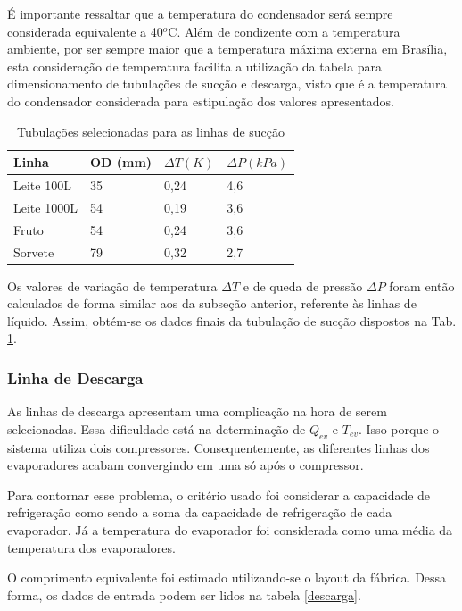 \documentclass[10pt,a4paper]{article}
\begin{document}
É importante ressaltar que a temperatura do condensador será sempre considerada equivalente a 40$^o$C. Além de condizente com a temperatura ambiente, por ser sempre maior que a temperatura máxima externa em Brasília, esta consideração de temperatura facilita a utilização da tabela para dimensionamento de tubulações de sucção e descarga, visto que é a temperatura do condensador considerada para estipulação dos valores apresentados.

\begin{table}[h!]
    \centering
    \vspace{0.8mm}
    \caption{Tubulações selecionadas para as linhas de sucção}
    \begin{tabular}{|l|l|l|l|}
        \hline      
       Linha  & OD (mm) & $\Delta T(K)$ & $\Delta P(kPa)$ \\ \hline
        Leite 100L & 35 & 0,24 & 4,6 \\ \hline
        Leite 1000L & 54 & 0,19 & 3,6 \\ \hline
        Fruto & 54 & 0,24 & 3,6 \\ \hline
        Sorvete & 79 & 0,32 & 2,7 \\ \hline
    \end{tabular}
    \label{tubossuccao}
\end{table}

Os valores de variação de temperatura $\Delta T$ e de queda de pressão $\Delta P$ foram então calculados de forma similar aos da subseção anterior, referente às linhas de líquido. Assim, obtém-se os dados finais da tubulação de sucção dispostos na Tab. \ref{tubossuccao}.

\subsubsection{{Linha de Descarga}}

As linhas de descarga apresentam uma complicação na hora de serem selecionadas. Essa dificuldade está na determinação de $Q_{ev}$ e $T_{ev}$. Isso porque o sistema utiliza dois compressores. Consequentemente, as diferentes linhas dos evaporadores acabam convergindo em uma só após o compressor.

Para contornar esse problema, o critério usado foi considerar a capacidade de refrigeração como sendo a soma da capacidade de refrigeração de cada evaporador. Já a temperatura do evaporador foi considerada como uma média da temperatura dos evaporadores.

O comprimento equivalente foi estimado utilizando-se o layout da fábrica. Dessa forma, os dados de entrada podem ser lidos na tabela \ref{descarga}.
\end{document}
